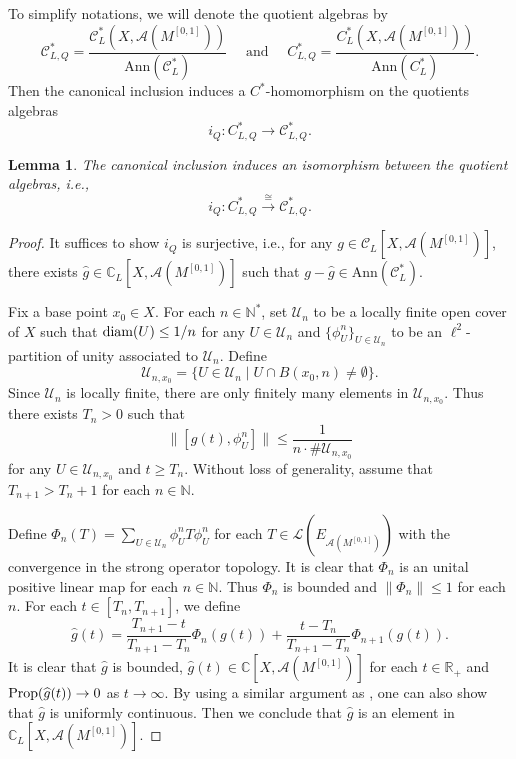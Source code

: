 \documentclass[11pt]{article}
\theoremstyle{definition}
\theoremstyle{plain}
\newtheorem{Lem}[Def]{Lemma}
\def\IN{\mathbb N}\def\IR{\mathbb R}\def\IE{\mathbb E}\def\IC{\mathbb C}\def\IL{\mathbb L}\def\IQ{\mathbb Q}\def\IA{\mathbb A}\def\IZ{\mathbb Z}
\def\A{\mathcal A}\def\C{\mathcal C}\def\B{\mathcal B}\def\E{\mathcal E}\def\O{\mathcal O}\def\h{\mathfrak h}\def\K{\mathcal K}\def\F{\mathcal F}\def\P{\mathcal P}\def\L{\mathcal L}\def\R{\mathcal R}\def\Q{\mathcal Q}\def\H{\mathcal H}\def\S{\mathcal S}\def\N{\mathcal N}\def\U{\mathcal U}\def\V{\mathcal V}
\def\sC{\mathscr C}
\def\prop{\textup{Prop}}
\def\diam{\textup{diam}}
\def\wh{\widehat}
\begin{document}
\begin{appendices}
To simplify notations, we will denote the quotient algebras by
$$\sC^*_{L,Q}=\frac{\sC^*_L(X,\A(M^{[0,1]}))}{\mathrm{Ann}(\sC^*_L)}\quad\text{ and }\quad C^*_{L,Q}=\frac{C^*_L(X,\A(M^{[0,1]}))}{\mathrm{Ann}(C^*_L)}.$$
Then the canonical inclusion induces a $C^*$-homomorphism on the quotients algebras
$$i_Q:C^*_{L,Q}\to \sC^*_{L,Q}.$$

\begin{Lem}\label{quo-iso}
The canonical inclusion induces an isomorphism between the quotient algebras, i.e.,
$$i_Q:C^*_{L,Q}\xrightarrow{\cong} \sC^*_{L,Q}.$$
\end{Lem}

\begin{proof}
It suffices to show $i_Q$ is surjective, i.e., for any $g\in\sC_L[X,\A(M^{[0,1]})]$, there exists $\wh g\in\IC_L[X,\A(M^{[0,1]})]$ such that $g-\wh g\in \mathrm{Ann}(\sC^*_L)$.

Fix a base point $x_0\in X$. For each $n\in\IN^*$, set $\U_n$ to be a locally finite open cover of $X$ such that $\diam(U)\leq 1/n$ for any $U\in\U_n$ and $\{\phi_U^n\}_{U\in\U_n}$ to be an $\ell^2$-partition of unity associated to $\U_n$. Define
$$\U_{n,x_0}=\{U\in\U_n\mid U\cap B(x_0,n)\neq\emptyset\}.$$
Since $\U_n$ is locally finite, there are only finitely many elements in $\U_{n,x_0}$. Thus there exists $T_n>0$ such that
$$\|[g(t),\phi^n_U]\|\leq\frac{1}{n\cdot\#\U_{n,x_0}}$$
for any $U\in\U_{n,x_0}$ and $t\geq T_n$. Without loss of generality, assume that $T_{n+1}>T_n+1$ for each $n\in\IN$.

Define $\Phi_n(T)=\sum_{U\in\U_n}\phi^n_UT\phi_U^n$ for each $T\in\L(E_{\A(M^{[0,1]})})$ with the convergence in the strong operator topology. It is clear that $\Phi_n$ is an unital positive linear map for each $n\in\IN$. Thus $\Phi_n$ is bounded and $\|\Phi_n\|\leq 1$ for each $n$. For each $t\in[T_n,T_{n+1}]$, we define
\[\wh g(t)=\frac{T_{n+1}-t}{T_{n+1}-T_n}\Phi_n(g(t))+\frac{t-T_n}{T_{n+1}-T_n}\Phi_{n+1}(g(t)).\]
It is clear that $\wh g$ is bounded, $\wh g(t)\in\IC[X,\A(M^{[0,1]})]$ for each $t\in\IR_+$ and $\prop(\wh g(t))\to0$ as $t\to\infty$. By using a similar argument as \cite[Lemma 2.2]{QR2010}, one can also show that $\wh g$ is uniformly continuous. Then we conclude that $\wh g$ is an element in $\IC_L[X,\A(M^{[0,1]})]$.


\end{proof}
\end{appendices}
\end{document}
